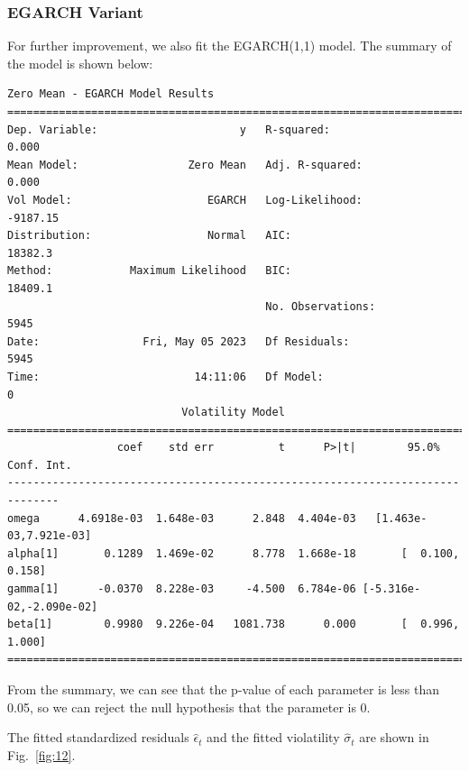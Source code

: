 \documentclass[runningheads]{llncs}
\begin{document}
\subsubsection{EGARCH Variant}

For further improvement, we also fit the EGARCH(1,1) model. The summary of the model is shown below:

\begin{verbatim}
Zero Mean - EGARCH Model Results                       
==============================================================================
Dep. Variable:                      y   R-squared:                       0.000
Mean Model:                 Zero Mean   Adj. R-squared:                  0.000
Vol Model:                     EGARCH   Log-Likelihood:               -9187.15
Distribution:                  Normal   AIC:                           18382.3
Method:            Maximum Likelihood   BIC:                           18409.1
                                        No. Observations:                 5945
Date:                Fri, May 05 2023   Df Residuals:                     5945
Time:                        14:11:06   Df Model:                            0
                           Volatility Model                               
==============================================================================
                 coef    std err          t      P>|t|        95.0% Conf. Int.
------------------------------------------------------------------------------
omega      4.6918e-03  1.648e-03      2.848  4.404e-03   [1.463e-03,7.921e-03]
alpha[1]       0.1289  1.469e-02      8.778  1.668e-18       [  0.100,  0.158]
gamma[1]      -0.0370  8.228e-03     -4.500  6.784e-06 [-5.316e-02,-2.090e-02]
beta[1]        0.9980  9.226e-04   1081.738      0.000       [  0.996,  1.000]
==============================================================================
\end{verbatim}

From the summary, we can see that the p-value of each parameter is less than 0.05, so we can reject the null hypothesis that the parameter is 0.

The fitted standardized residuals $\hat{\epsilon}_t$ and the fitted violatility $\hat{\sigma}_t$ are shown in Fig.~\ref{fig:12}.

\end{document}
